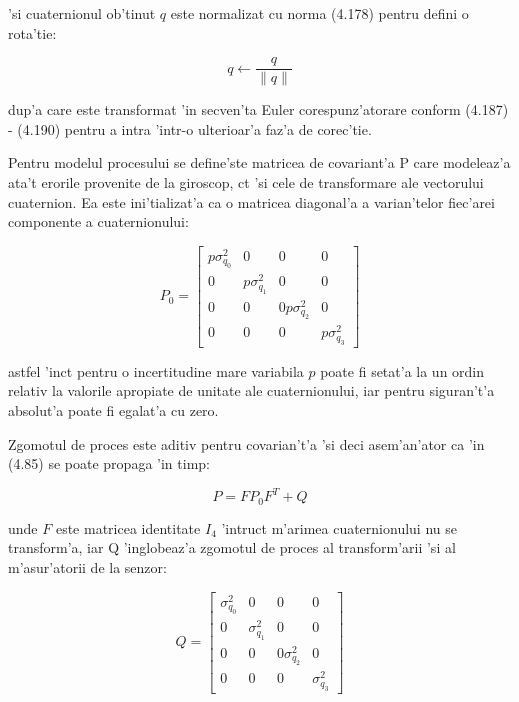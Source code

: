 \documentclass[12pt,a4paper,twoside]{report}
\begin{document}
'si cuaternionul ob'tinut $q$ este normalizat cu norma (4.178) pentru defini o rota'tie:

\begin{equation}
    q \leftarrow \frac{q}{\lVert  q  \rVert}
\end{equation}

dup'a care este transformat 'in secven'ta Euler corespunz'atorare conform (4.187) - (4.190) pentru a intra 'intr-o ulterioar'a faz'a de corec'tie. 

\vspace{5px}

Pentru modelul procesului se define'ste matricea de covariant'a P care modeleaz'a ata't erorile provenite de la giroscop, c\ia t 'si cele de transformare ale vectorului cuaternion. Ea este ini'tializat'a ca o matricea diagonal'a a varian'telor fiec'arei componente a cuaternionului:

\begin{equation}
    P_0 = \begin{bmatrix}
    p \sigma_{q_0}^2 & 0 & 0 & 0 \\
    0 & p \sigma_{q_1}^2 & 0 & 0  \\
    0 & 0 & 0 p \sigma_{q_2}^2 & 0 \\
    0 & 0 & 0 & p \sigma_{q_3}^2
    \end{bmatrix}
\end{equation}

astfel 'inc\ia t pentru o incertitudine mare variabila $p$ poate fi setat'a la un ordin relativ la valorile apropiate de unitate ale cuaternionului, iar pentru siguran't'a absolut'a poate fi egalat'a cu zero. 

Zgomotul de proces este aditiv pentru covarian't'a 'si deci asem'an'ator ca 'in (4.85) se poate propaga 'in timp:

\begin{equation}
    P = F P_0 F^T + Q
\end{equation}

unde $F$ este matricea identitate $I_4$ 'intruc\ia t m'arimea cuaternionului nu se transform'a, iar Q 'inglobeaz'a zgomotul de proces al transform'arii 'si al m'asur'atorii de la senzor: 

\begin{equation}
    Q = \begin{bmatrix}
     \sigma_{q_0}^2 & 0 & 0 & 0 \\
    0 & \sigma_{q_1}^2 & 0 & 0  \\
    0 & 0 & 0  \sigma_{q_2}^2 & 0 \\
    0 & 0 & 0 &  \sigma_{q_3}^2
    \end{bmatrix}
\end{equation}
\end{document}
